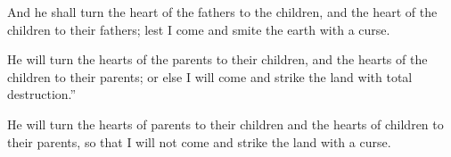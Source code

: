 			\begin{versebox}
					\item[BHS] 
					\item[LXX] 
					\item[ASV] And he shall turn the heart of the fathers to the children, and the heart of the children to their fathers; lest I come and smite the earth with a curse.
					\item[NIV] He will turn the hearts of the parents to their children, and the hearts of the children to their parents; or else I will come and strike the land with total destruction.”
					\item[NRSV] He will turn the hearts of parents to their children and the hearts of children to their parents, so that I will not come and strike the land with a curse.
			\end{versebox}

